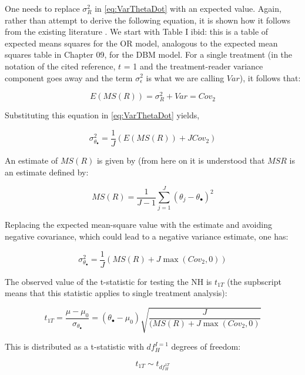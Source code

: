 \documentclass[
]{book}
\begin{document}
One needs to replace \(\sigma_{R}^{2}\) in \eqref{eq:VarThetaDot} with an expected value. Again, rather than attempt to derive the following equation, it is shown how it follows from the existing literature \citep{RN2508}. We start with Table I ibid: this is a table of expected means squares for the OR model, analogous to the expected mean squares table in Chapter 09, for the DBM model. For a single treatment (in the notation of the cited reference, \(t\) = 1 and the treatment-reader variance component goes away and the term \(\sigma_{\epsilon}^{2}\) is what we are calling \(Var\)), it follows that:

\[E(MS(R))=\sigma_{R}^{2}+Var=Cov_2\]

Substituting this equation in \eqref{eq:VarThetaDot} yields,

\begin{equation}
\sigma_{\theta_{\bullet}}^{2}=\frac{1}{J}(E(MS(R))+JCov_2)
\label{eq:VarThetaDot}
\end{equation}

An estimate of \(MS(R)\) is given by (from here on it is understood that \(MSR\) is an estimate defined by:

\begin{equation}
MS(R)=\frac{1}{J-1}\sum_{j=1}^{J}(\theta_j - \theta_{\bullet})^2
\label{eq:EstMsR1T}
\end{equation}

Replacing the expected mean-square value with the estimate and avoiding negative covariance, which could lead to a negative variance estimate, one has:

\begin{equation}
\sigma_{\theta_{\bullet}}^{2}=\frac{1}{J}(MS(R)+J\max(Cov_2,0))
\label{eq:EstVarThetaDot}
\end{equation}

The observed value of the t-statistic for testing the NH is \(t_{1T}\) (the supbscript means that this statistic applies to single treatment analysis):

\begin{equation}
t_{1T}=\frac{\mu-\mu_0}{\sigma_{\theta_{\bullet}}}=(\theta_{\bullet}-\mu_0)\sqrt{\frac{J}{(MS(R)+J\max(Cov_2,0)}}
\label{eq:DefTStat1T}
\end{equation}

This is distributed as a t-statistic with \(df_{H}^{I=1}\) degrees of freedom:

\begin{equation}
t_{1T} \sim t_{df_{H}^{1T}}
\label{eq:DistTStat1T}
\end{equation}
\end{document}
